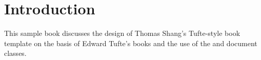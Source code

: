 

\cleardoublepage
\chapter*{Introduction}

This sample book discusses the design of Thomas Shang's Tufte-style book template on the basis of Edward Tufte's
books\cite{Tufte2001,Tufte1990,Tufte1997,Tufte2006}
and the use of the  and  document classes.

\cleardoublepage
